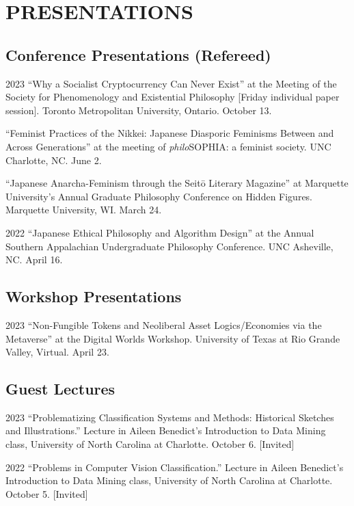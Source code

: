 \documentclass{article}
\begin{document}
\section*{\normalsize{PRESENTATIONS}}
\subsection*{\normalsize{Conference Presentations (Refereed)}}
\begin{tablist}
    \item[2023] \tab{}\enquote{Why a Socialist Cryptocurrency Can Never Exist} at the  Meeting of the Society for Phenomenology and Existential Philosophy [Friday individual paper session]. Toronto Metropolitan University, Ontario. October 13.
    \item[] \tab{}\enquote{Feminist Practices of the Nikkei: Japanese Diasporic Feminisms Between and Across Generations} at the  meeting of \textit{philo}SOPHIA: a feminist society. UNC Charlotte, NC. June 2.
    \item[] \tab{}\enquote{Japanese Anarcha-Feminism through the Seitō Literary Magazine} at Marquette University's Annual Graduate Philosophy Conference on Hidden Figures. Marquette University, WI. March 24.
    \item[2022] \tab{}\enquote{Japanese Ethical Philosophy and Algorithm Design} at the  Annual Southern Appalachian Undergraduate Philosophy Conference. UNC Asheville, NC. April 16.
\end{tablist}
\subsection*{\normalsize{Workshop Presentations}}
\begin{tablist}
    \item[2023] \tab{}\enquote{Non-Fungible Tokens and Neoliberal Asset Logics/Economies via the Metaverse} at the Digital Worlds Workshop. University of Texas at Rio Grande Valley, Virtual. April 23.
\end{tablist}
\subsection*{\normalsize{Guest Lectures}}
\begin{tablist}
    \item[2023] \tab{}\enquote{Problematizing Classification Systems and Methods: Historical Sketches and Illustrations.} Lecture in Aileen Benedict's Introduction to Data Mining class, University of North Carolina at Charlotte. October 6. [Invited]
    \item[2022] \tab{}\enquote{Problems in Computer Vision Classification.} Lecture in Aileen Benedict's Introduction to Data Mining class, University of North Carolina at Charlotte. October 5. [Invited]
\end{tablist}
\end{document}
